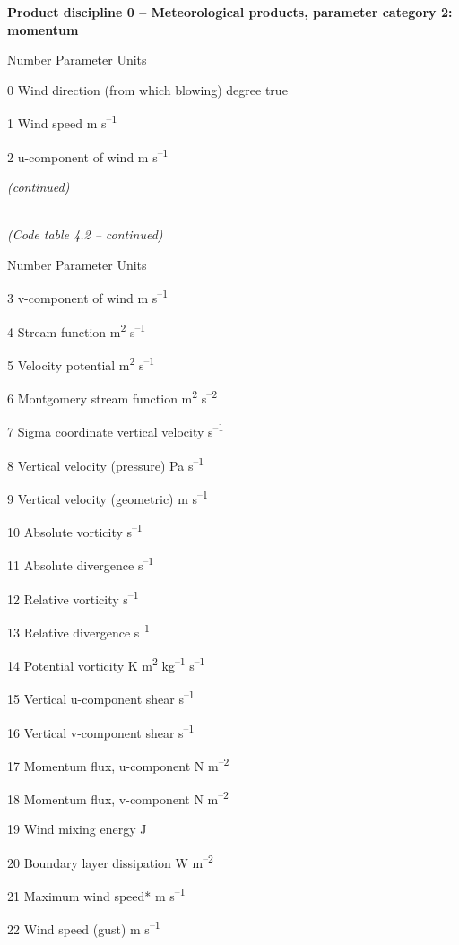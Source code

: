 \textbf{Product discipline 0 -- Meteorological products, parameter category 2: momentum}

Number Parameter Units

0 Wind direction (from which blowing) degree true

1 Wind speed m s\textsuperscript{--1}

2 u-component of wind m s\textsuperscript{--1}

\emph{(continued)}

\emph{\\
(Code table 4.2 -- continued)}

Number Parameter Units

3 v-component of wind m s\textsuperscript{--1}

4 Stream function m\textsuperscript{2} s\textsuperscript{--1}

5 Velocity potential m\textsuperscript{2} s\textsuperscript{--1}

6 Montgomery stream function m\textsuperscript{2} s\textsuperscript{--2}

7 Sigma coordinate vertical velocity s\textsuperscript{--1}

8 Vertical velocity (pressure) Pa s\textsuperscript{--1}

9 Vertical velocity (geometric) m s\textsuperscript{--1}

10 Absolute vorticity s\textsuperscript{--1}

11 Absolute divergence s\textsuperscript{--1}

12 Relative vorticity s\textsuperscript{--1}

13 Relative divergence s\textsuperscript{--1}

14 Potential vorticity K m\textsuperscript{2} kg\textsuperscript{--1} s\textsuperscript{--1}

15 Vertical u-component shear s\textsuperscript{--1}

16 Vertical v-component shear s\textsuperscript{--1}

17 Momentum flux, u-component N m\textsuperscript{--2}

18 Momentum flux, v-component N m\textsuperscript{--2}

19 Wind mixing energy J

20 Boundary layer dissipation W m\textsuperscript{--2}

21 Maximum wind speed* m s\textsuperscript{--1}

22 Wind speed (gust) m s\textsuperscript{--1}

